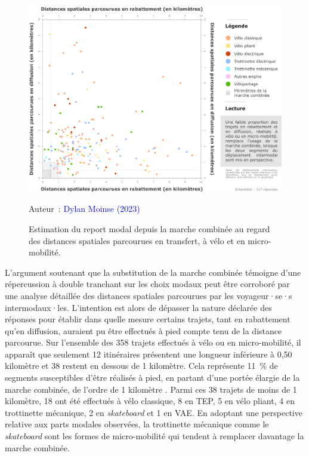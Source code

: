 \begin{refsegment}
    \begin{figure}[h!]\vspace*{4pt}
        \caption{Estimation du report modal depuis la marche combinée au regard des distances spatiales parcourues en transfert, à vélo et en micro-mobilité.}
        \label{fig-chap4:distances-substitution-modale}
        \centerline{\includegraphics[width=1\columnwidth]{src/Figures/Chap-4/FR_Distances_substitution_modale.pdf}}
        \vspace{5pt}
        \begin{flushright}\scriptsize{
        Auteur~: \textcolor{blue}{Dylan Moinse (2023)}
        }\end{flushright}
    \end{figure}

L'argument soutenant que la substitution de la marche combinée témoigne d'une répercussion à double tranchant sur les choix modaux peut être corroboré par une analyse détaillée des distances spatiales parcourues par les voyageur·se·s intermodaux·les. L'intention est alors de dépasser la nature déclarée des réponses pour établir dans quelle mesure certains trajets, tant en rabattement qu'en diffusion, auraient pu être effectués à pied compte tenu de la distance parcourue. Sur l'ensemble des 358 trajets effectués à vélo ou en micro-mobilité, il apparaît que seulement 12 itinéraires présentent une longueur inférieure à 0,50 kilomètre et 38 restent en dessous de 1 kilomètre. Cela représente 11~\% de segments susceptibles d'être réalisés à pied, en partant d'une portée élargie de la marche combinée, de l'ordre de 1 kilomètre \textcolor{blue}{\autocite[34]{canepa_bursting_2007}}. Parmi ces 38 trajets de moins de 1 kilomètre, 18 ont été effectués à vélo classique, 8 en \acrshort{TEP}, 5 en vélo pliant, 4 en trottinette mécanique, 2 en \textsl{skateboard} et 1 en \acrshort{VAE}. En adoptant une perspective relative aux parts modales observées, la trottinette mécanique comme le \textsl{skateboard} sont les formes de micro-mobilité qui tendent à remplacer davantage la marche combinée.%


\end{refsegment}
